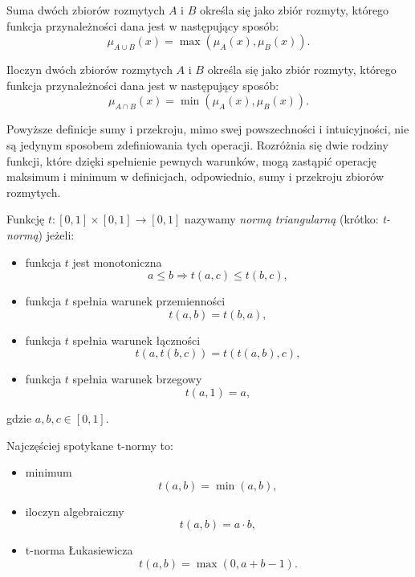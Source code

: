 \begin{definition}
Suma dwóch zbiorów rozmytych $A$ i $B$ określa się jako zbiór rozmyty, którego
funkcja przynależności dana jest w następujący sposób:
\begin{equation}
\mu_{A \cup B}(x) = \max(\mu_A(x), \mu_B(x)).
\end{equation}
\end{definition}

\begin{definition}
Iloczyn dwóch zbiorów rozmytych $A$ i $B$ określa się jako zbiór rozmyty,
którego funkcja przynależności dana jest w następujący sposób:
\begin{equation}
\mu_{A \cap B}(x) = \min(\mu_A(x), \mu_B(x)).
\end{equation}
\end{definition}

Powyższe definicje sumy i przekroju, mimo swej powszechności i intuicyjności,
nie są jedynym sposobem zdefiniowania tych operacji. Rozróżnia się dwie rodziny
funkcji, które dzięki spełnienie pewnych warunków, mogą zastąpić operację
maksimum i minimum w definicjach, odpowiednio, sumy i przekroju zbiorów
rozmytych.

\begin{definition}[t-norma]
Funkcję $t : [0,1] \times [0,1] \rightarrow [0,1]$ nazywamy \emph{normą
triangularną} (krótko: \emph{t-normą}) jeżeli:
\begin{itemize}
  \item funkcja $t$ jest monotoniczna $$a \leq b \Rightarrow t(a,c) \leq
  t(b,c),$$
  \item funkcja $t$ spełnia warunek przemienności $$t(a,b) = t(b,a),$$
  \item funkcja $t$ spełnia warunek łączności $$t(a, t(b,c)) = t(t(a,b),c),$$
  \item funkcja $t$ spełnia warunek brzegowy $$t(a,1)=a,$$
\end{itemize}
gdzie $a, b, c \in [0,1]$.
\end{definition}

Najczęściej spotykane t-normy to:
\begin{itemize}
  \item minimum $$t(a,b) = \min(a,b),$$
  \item iloczyn algebraiczny $$t(a,b) = a \cdot b,$$
  \item t-norma Łukasiewicza $$t(a,b) = \max(0, a+b-1).$$
\end{itemize}

